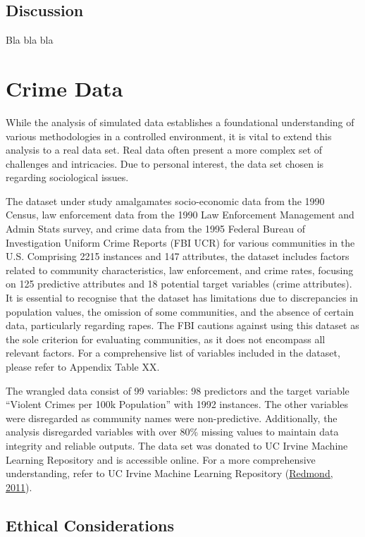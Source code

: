 \documentclass[
  11pt,
]{article}
\begin{document}
\subsection{Discussion}

Bla bla bla

\newpage

\section{Crime Data}

While the analysis of simulated data establishes a foundational
understanding of various methodologies in a controlled environment, it
is vital to extend this analysis to a real data set. Real data often
present a more complex set of challenges and intricacies. Due to
personal interest, the data set chosen is regarding sociological issues.

The dataset under study amalgamates socio-economic data from the 1990
Census, law enforcement data from the 1990 Law Enforcement Management
and Admin Stats survey, and crime data from the 1995 Federal Bureau of
Investigation Uniform Crime Reports (FBI UCR) for various communities in
the U.S. Comprising 2215 instances and 147 attributes, the dataset
includes factors related to community characteristics, law enforcement,
and crime rates, focusing on 125 predictive attributes and 18 potential
target variables (crime attributes). It is essential to recognise that
the dataset has limitations due to discrepancies in population values,
the omission of some communities, and the absence of certain data,
particularly regarding rapes. The FBI cautions against using this
dataset as the sole criterion for evaluating communities, as it does not
encompass all relevant factors. For a comprehensive list of variables
included in the dataset, please refer to Appendix Table XX.

The wrangled data consist of 99 variables: 98 predictors and the target
variable ``Violent Crimes per 100k Population'' with 1992 instances. The
other variables were disregarded as community names were non-predictive.
Additionally, the analysis disregarded variables with over 80\% missing
values to maintain data integrity and reliable outputs. The data set was
donated to UC Irvine Machine Learning Repository and is accessible
online. For a more comprehensive understanding, refer to UC Irvine
Machine Learning Repository
(\protect\hyperlink{ref-misc_communities_and_crime_unnormalized_211}{Redmond,
2011}).

\subsection{Ethical Considerations}
\end{document}
